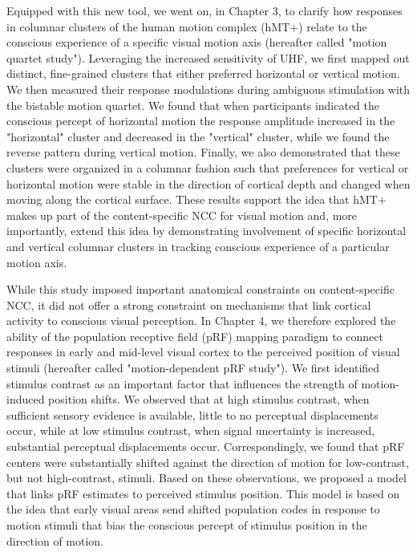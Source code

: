 Equipped with this new tool, we went on, in Chapter 3, to clarify how responses in columnar clusters of the human motion complex (hMT+) relate to the conscious experience of a specific visual motion axis (hereafter called "motion quartet study"). Leveraging the increased sensitivity of UHF, we first mapped out distinct, fine-grained clusters that either preferred horizontal or vertical motion. We then measured their response modulations during ambiguous stimulation with the bistable motion quartet. We found that when participants indicated the conscious percept of horizontal motion the response amplitude increased in the "horizontal" cluster and decreased in the "vertical" cluster, while we found the reverse pattern during vertical motion. Finally, we also demonstrated that these clusters were organized in a columnar fashion such that preferences for vertical or horizontal motion were stable in the direction of cortical depth and changed when moving along the cortical surface. These results support the idea that hMT+ makes up part of the content-specific NCC for visual motion and, more importantly, extend this idea by demonstrating involvement of specific horizontal and vertical columnar clusters in tracking conscious experience of a particular motion axis.

While this study imposed important anatomical constraints on content-specific NCC, it did not offer a strong constraint on mechanisms that link cortical activity to conscious visual perception. In Chapter 4, we therefore explored the ability of the population receptive field (pRF) mapping paradigm to connect responses in early and mid-level visual cortex to the perceived position of visual stimuli (hereafter called "motion-dependent pRF study"). We first identified stimulus contrast as an important factor that influences the strength of motion-induced position shifts. We observed that at high stimulus contrast, when sufficient sensory evidence is available, little to no perceptual displacements occur, while at low stimulus contrast, when signal uncertainty is increased, substantial perceptual displacements occur. Correspondingly, we found that pRF centers were substantially shifted against the direction of motion for low-contrast, but not high-contrast, stimuli. Based on these observations, we proposed a model that links pRF estimates to perceived stimulus position. This model is based on the idea that early visual areas send shifted population codes in response to motion stimuli that bias the conscious percept of stimulus position in the direction of motion.

